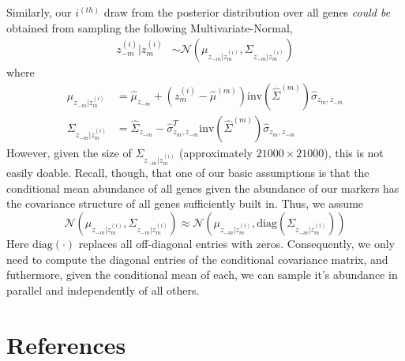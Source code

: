 \documentclass[10pt]{article}
\begin{document}
Similarly, our $i^{(th)}$ draw from the posterior distribution over all genes \emph{could be} obtained from sampling the following Multivariate-Normal,
\begin{align*}
z_{-m}^{(i)}|z^{(i)}_m & \sim \mathcal{N}\left(\mu_{z_{-m}| z_{m}^{(i)}}, \Sigma_{z_{-m}| z_{m}^{(i)}}  \right) 
\end{align*}
where
\begin{align*}
\mu_{z_{-m}| z_{m}^{(i)}}  &= \hat{\mu}_{z_{-m}} + \left(z_m^{(i)}  - \hat{\mu}^{(m)} \right)\textrm{inv}\left( \hat{\Sigma}^{(m)} \right)\hat{\sigma}_{z_{m},z_{-m}} \\
\Sigma_{z_{-m}| z_{m}^{(i)}} & = \hat{\Sigma}_{z_{-m}} -  \hat{\sigma}_{z_{m},z_{-m}}^T  \textrm{inv}\left( \hat{\Sigma}^{(m)} \right) \hat{\sigma}_{z_{m},z_{-m}}
\end{align*}
However, given the size of $\Sigma_{z_{-m}| z_{m}^{(i)}}$ (approximately $21000 \times 21000$), this is not easily doable. Recall, though, that one of our basic assumptions is that the conditional mean abundance of all genes given the abundance of our markers has the covariance structure of all genes sufficiently built in. Thus, we assume 
\[
\mathcal{N}\left(\mu_{z_{-m}| z_{m}^{(i)}}, \Sigma_{z_{-m}| z_{m}^{(i)}}  \right) \approx \mathcal{N}\left(\mu_{z_{-m}| z_{m}^{(i)}}, \textrm{diag}\left(\Sigma_{z_{-m}| z_{m}^{(i)}} \right) \right)
\]
Here $\textrm{diag}(\cdot)$ replaces all off-diagonal entries with zeros. Consequently, we only need to compute the diagonal entries of the conditional covariance matrix, and futhermore, given the conditional mean of each, we can sample it's abundance in parallel and independently of all others.






\section{References}

\end{document}
